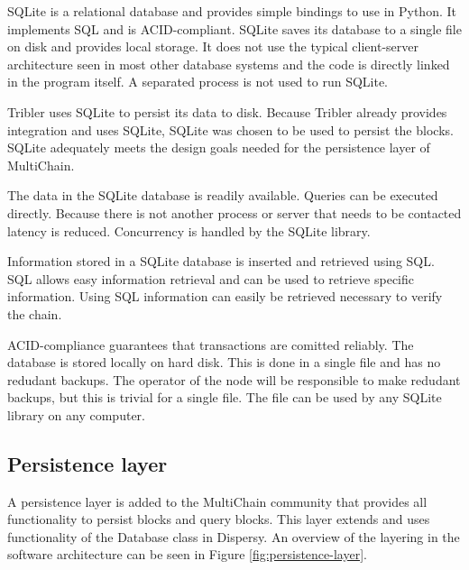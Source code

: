 SQLite is a relational database and provides simple bindings to use in Python\cite{owens-sqlite}.
It implements SQL and is ACID-compliant\cite{haerder-ACID}.
SQLite saves its database to a single file on disk and provides local storage.
It does not use the typical client-server architecture seen in most other database systems
and the code is directly linked in the program itself.
A separated process is not used to run SQLite.

Tribler uses SQLite to persist its data to disk.
Because Tribler already provides integration and uses SQLite,
SQLite was chosen to be used to persist the blocks.
SQLite adequately meets the design goals needed for the persistence layer of MultiChain.

The data in the SQLite database is readily available.
Queries can be executed directly.
Because there is not another process or server that needs to be contacted latency is reduced.
Concurrency is handled by the SQLite library.

Information stored in a SQLite database is inserted and retrieved using SQL\cite{date-sql}.
SQL allows easy information retrieval and can be used to retrieve specific information.
Using SQL information can easily be retrieved necessary to verify the chain.

ACID-compliance guarantees that transactions are comitted reliably.
The database is stored locally on hard disk.
This is done in a single file and has no redudant backups.
The operator of the node will be responsible to make redudant backups,
but this is trivial for a single file.
The file can be used by any SQLite library on any computer.

\subsection{Persistence layer}
A persistence layer is added to the MultiChain community
that provides all functionality to persist blocks and query blocks.
This layer extends and uses functionality of the Database class in Dispersy.
An overview of the layering in the software architecture can be seen in Figure \ref{fig:persistence-layer}.


